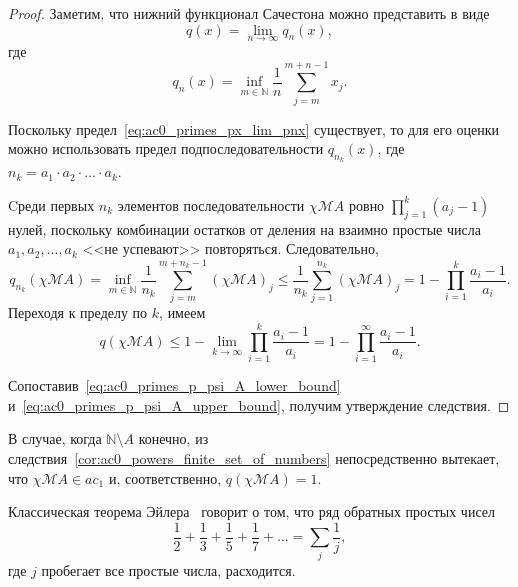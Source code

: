 \begin{proof}

	Заметим, что нижний функционал Сачестона можно представить в виде
	\begin{equation}
		\label{eq:ac0_primes_px_lim_pnx}
		q(x) = \lim_{n\to\infty} q_n(x)
		,
	\end{equation}
	где
	\begin{equation}
		q_n(x) = \inf_{m\in\mathbb{N}}  \frac{1}{n} \sum_{j=m}^{m+n-1} x_j
		.
	\end{equation}

	Поскольку предел~\eqref{eq:ac0_primes_px_lim_pnx} существует, то для его оценки можно использовать предел подпоследовательности
	$q_{n_k}(x)$, где $n_k = a_1\cdot a_2 \cdot ... \cdot a_k$.


	Cреди первых $n_k$ элементов последовательности $\chi\mathscr{M}A$
	ровно $\prod_{j=1}^k (a_j-1)$ нулей, поскольку комбинации остатков от деления
	на взаимно простые числа $a_1, a_2, ..., a_k$ <<не успевают>> повторяться.
	Следовательно,
	\begin{equation}
		q_{n_k}(\chi\mathscr{M}A) =
		\inf_{m\in\mathbb{N}}  \frac{1}{n_k} \sum_{j=m}^{m+n_k-1} (\chi\mathscr{M}A)_j
		\leq
		\frac{1}{n_k} \sum_{j=1}^{n_k} (\chi\mathscr{M}A)_j
		=
		1-\prod_{i=1}^k \frac{a_i-1}{a_i}
		.
	\end{equation}
	Переходя к пределу по $k$, имеем
	\begin{equation}
		\label{eq:ac0_primes_p_psi_A_lower_bound}
		q(\chi\mathscr{M}A) \leq 1-\lim_{k\to \infty} \prod_{i=1}^k \frac{a_i-1}{a_i}
		=
		1-\prod_{i=1}^\infty \frac{a_i-1}{a_i}
		.
	\end{equation}

	Сопоставив~\eqref{eq:ac0_primes_p_psi_A_lower_bound} и~\eqref{eq:ac0_primes_p_psi_A_upper_bound}, получим утверждение следствия.
\end{proof}

\begin{corollary}
	В случае, когда $\mathbb{N}\setminus A$ конечно,
	из следствия~\ref{cor:ac0_powers_finite_set_of_numbers} непосредственно вытекает, что $\chi\mathscr{M}A\in ac_1$
	и, соответственно, $q(\chi\mathscr{M}A)=1$.
\end{corollary}



Классическая теорема Эйлера~\cite{euler1737variae} говорит о том, что
ряд обратных простых чисел
\begin{equation}
	\frac{1}{2} + \frac{1}{3} + \frac{1}{5} + \frac{1}{7} + ...
	=
	\sum_j \frac{1}{j},
\end{equation}
где $j$ пробегает все простые числа, расходится.

